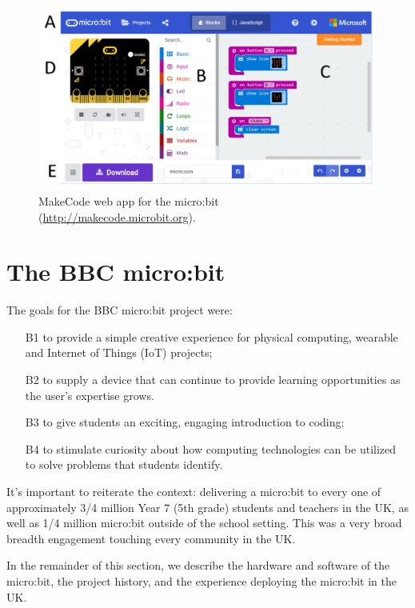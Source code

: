 \begin{figure}[t]
    \includegraphics[width=6in]{images/webApp.png}
    \caption{\label{fig:snapshot}MakeCode web app for the micro:bit (\url{http://makecode.microbit.org}).}
  \end{figure}

\section{The BBC micro:bit}
\label{sec:microbit}

The goals for the BBC micro:bit project were:
\begin{itemize}
    \item[B1] to provide a simple creative experience for physical computing, wearable and Internet of Things (IoT) projects;
    \item[B2] to supply a device that can continue to provide learning opportunities as the user's expertise grows.
    \item[B3] to give students an exciting, engaging introduction to coding;
    \item[B4] to stimulate curiosity about how computing technologies can be utilized to solve problems that students identify.
\end{itemize}

It's important to reiterate the context: delivering a micro:bit to every one of 
approximately 3/4 million Year 7 (5th grade) students and teachers in the UK, as
well as 1/4 million micro:bit outside of the school setting. This was a very
broad breadth engagement touching every community in the UK.

In the remainder of this section, we describe the hardware and software
of the micro:bit, the project history, and the experience deploying
the micro:bit in the UK.

